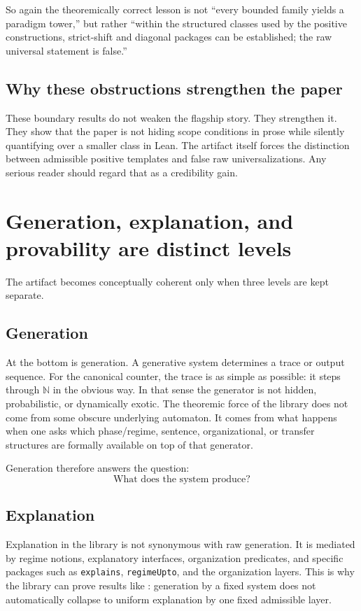 \documentclass[11pt,a4paper]{article}
\theoremstyle{definition}
\begin{document}
So again the theoremically correct lesson is not ``every bounded family yields a paradigm tower,'' but rather ``within the structured classes used by the positive constructions, strict-shift and diagonal packages can be established; the raw universal statement is false.''

\subsection{Why these obstructions strengthen the paper}

These boundary results do not weaken the flagship story. They strengthen it. They show that the paper is not hiding scope conditions in prose while silently quantifying over a smaller class in Lean. The artifact itself forces the distinction between admissible positive templates and false raw universalizations. Any serious reader should regard that as a credibility gain.

\section{Generation, explanation, and provability are distinct levels}\label{sec:three-levels}

The artifact becomes conceptually coherent only when three levels are kept separate.

\subsection{Generation}

At the bottom is generation. A generative system determines a trace or output sequence. For the canonical counter, the trace is as simple as possible: it steps through $\mathbb{N}$ in the obvious way. In that sense the generator is not hidden, probabilistic, or dynamically exotic. The theoremic force of the library does not come from some obscure underlying automaton. It comes from what happens when one asks which phase/regime, sentence, organizational, or transfer structures are formally available on top of that generator.

Generation therefore answers the question:
\[
\text{What does the system produce?}
\]

\subsection{Explanation}

Explanation in the library is not synonymous with raw generation. It is mediated by regime notions, explanatory interfaces, organization predicates, and specific packages such as \texttt{explains}, \texttt{regimeUpto}, and the organization layers. This is why the library can prove results like : generation by a fixed system does not automatically collapse to uniform explanation by one fixed admissible layer.
\end{document}
